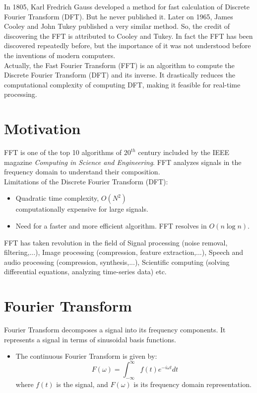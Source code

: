 \documentclass[28]{report}
\begin{document}
In 1805, Karl Fredrich Gauss developed a method for fast calculation of Discrete Fourier Transform (DFT). But he never published it. Later on 1965, James Cooley and John Tukey published a very similar method. So, the credit of discovering the FFT is attributed to Cooley and Tukey. In fact the FFT has been discovered repeatedly before, but the importance of it was not understood before the inventions of modern computers. \\


Actually, the Fast Fourier Transform (FFT) is an algorithm to compute the Discrete Fourier Transform (DFT) and its inverse. It drastically reduces the computational complexity of computing
DFT, making it feasible for real-time processing.
\section{Motivation}
FFT is one of the top 10 algorithms of $20^{th}$ century included by the IEEE magazine {\it{Computing in Science and Engineering}}. FFT analyzes signals in the frequency domain to understand their
composition.\\ Limitations of the Discrete Fourier Transform (DFT):
 \begin{itemize}
        \item Quadratic time complexity, $O(N^2)$ \\ computationally expensive for large signals.
        \item Need for a faster and more efficient algorithm. FFT resolves in $O(n\log n)$.
      \end{itemize}
       FFT has taken revolution in the field of Signal processing (noise removal, filtering,...), Image processing (compression, feature extraction,...), Speech and audio processing (compression, synthesis,...), Scientific computing (solving differential equations, analyzing time-series data) etc.
\section{Fourier Transform}
Fourier Transform decomposes a signal into its frequency components.
It represents a signal in terms of sinusoidal basis functions.
\begin{itemize}
    \item The continuous Fourier Transform is given by:
    \[ F(\omega) = \int_{-\infty}^{\infty} f(t) e^{-i\omega t} dt \]
    where $f(t)$ is the signal, and $F(\omega)$ is its frequency domain representation.
  \end{itemize}
\end{document}

